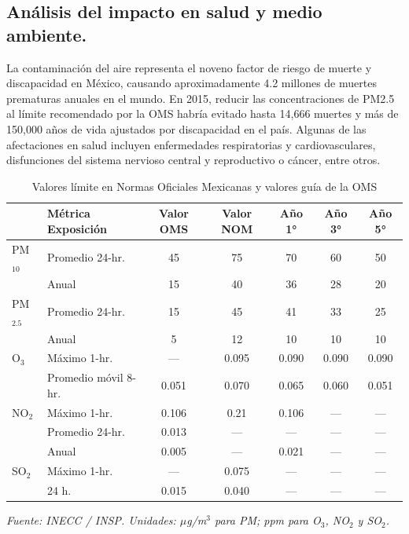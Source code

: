 \documentclass{article}
\begin{document}
\subsection{Análisis del impacto en salud y medio ambiente.}
    La contaminación del aire representa el noveno factor de riesgo de muerte y discapacidad en México, causando aproximadamente 4.2 millones de muertes prematuras 
    anuales en el mundo. En 2015, reducir las concentraciones de PM2.5 al límite recomendado por la OMS habría evitado hasta 14,666 muertes y más de 150,000 años de 
    vida ajustados por discapacidad en el país. Algunas de las afectaciones en salud incluyen enfermedades respiratorias y cardiovasculares, disfunciones del sistema 
    nervioso central y reproductivo o cáncer, entre otros.
    \begin{table}[h]
        \centering
        \caption{Valores límite en Normas Oficiales Mexicanas y valores guía de la OMS}
        \begin{tabular}{llccccc}
            \hline
             & \textbf{Métrica Exposición} & \textbf{Valor OMS} & \textbf{Valor NOM} & \textbf{Año 1°} & \textbf{Año 3°} & \textbf{Año 5°} \\
            \hline
            PM$_{10}$ & Promedio 24-hr. & 45 & 75 & 70 & 60 & 50 \\
                      & Anual            & 15 & 40 & 36 & 28 & 20 \\
            \hline
            PM$_{2.5}$ & Promedio 24-hr. & 15 & 45 & 41 & 33 & 25 \\
                       & Anual            &  5 & 12 & 10 & 10 & 10 \\
            \hline
            O$_3$ & Máximo 1-hr.         & ---   & 0.095 & 0.090 & 0.090 & 0.090 \\
                  & Promedio móvil 8-hr. & 0.051 & 0.070 & 0.065 & 0.060 & 0.051 \\
            \hline
            NO$_2$ & Máximo 1-hr.    & 0.106 & 0.21  & 0.106 & ---   & ---   \\
                   & Promedio 24-hr. & 0.013 & ---   & ---   & ---   & ---   \\
                   & Anual           & 0.005 & ---   & 0.021 & ---   & ---   \\
            \hline
            SO$_2$ & Máximo 1-hr. & ---   & 0.075 & --- & --- & --- \\
                   & 24 h.         & 0.015 & 0.040 & --- & --- & --- \\
            \hline
        \end{tabular}
        \small\textit{Fuente: INECC / INSP. Unidades: $\mu$g/m$^3$ para PM; ppm para O$_3$, NO$_2$ y SO$_2$.}
    \end{table}
\end{document}
